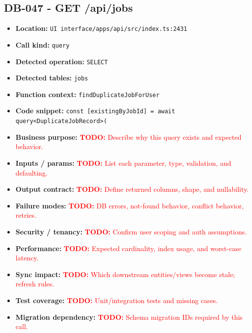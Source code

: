 \documentclass[11pt]{article}
\newcommand{\todoitem}[1]{\textcolor{red}{\textbf{TODO:} #1}}
\begin{document}
\subsection{DB-047 - GET /api/jobs}
\begin{itemize}[leftmargin=1.5em]
\item \textbf{Location:} \texttt{UI interface/apps/api/src/index.ts:2431}
\item \textbf{Call kind:} \texttt{query}
\item \textbf{Detected operation:} \texttt{SELECT}
\item \textbf{Detected tables:} \texttt{jobs}
\item \textbf{Function context:} \texttt{findDuplicateJobForUser}
\item \textbf{Code snippet:} \texttt{const [existingByJobId] = await query<DuplicateJobRecord>(}
\item \textbf{Business purpose:} \todoitem{Describe why this query exists and expected behavior.}
\item \textbf{Inputs / params:} \todoitem{List each parameter, type, validation, and defaulting.}
\item \textbf{Output contract:} \todoitem{Define returned columns, shape, and nullability.}
\item \textbf{Failure modes:} \todoitem{DB errors, not-found behavior, conflict behavior, retries.}
\item \textbf{Security / tenancy:} \todoitem{Confirm user scoping and auth assumptions.}
\item \textbf{Performance:} \todoitem{Expected cardinality, index usage, and worst-case latency.}
\item \textbf{Sync impact:} \todoitem{Which downstream entities/views become stale; refresh rules.}
\item \textbf{Test coverage:} \todoitem{Unit/integration tests and missing cases.}
\item \textbf{Migration dependency:} \todoitem{Schema migration IDs required by this call.}
\end{itemize}
\end{document}
